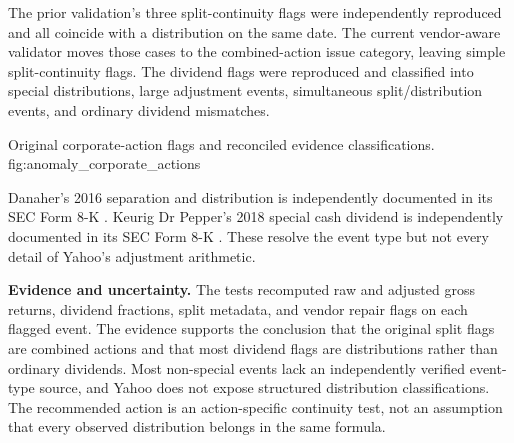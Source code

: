 The prior validation's three split-continuity flags were independently
reproduced and all coincide with a distribution on the same date. The current
vendor-aware validator moves those cases to the combined-action issue category,
leaving \SplitFlags{} simple split-continuity flags. The dividend flags were
reproduced and classified into special distributions, large adjustment events,
simultaneous split/distribution events, and ordinary dividend mismatches.


  {Original corporate-action flags and reconciled evidence classifications.}
  {fig:anomaly_corporate_actions}

Danaher's 2016 separation and distribution is independently documented in its
SEC Form 8-K \citep{secDHR2016}. Keurig Dr Pepper's 2018 special cash dividend
is independently documented in its SEC Form 8-K \citep{secKDP2018}. These
resolve the event type but not every detail of Yahoo's adjustment arithmetic.

\textbf{Evidence and uncertainty.} The tests recomputed raw and adjusted gross
returns, dividend fractions, split metadata, and vendor repair flags on each
flagged event. The evidence supports the conclusion that the original split flags are
combined actions and that most dividend flags are distributions rather than
ordinary dividends. Most non-special events lack an independently verified
event-type source, and Yahoo does not expose structured distribution
classifications. The recommended action is an action-specific continuity test,
not an assumption that every observed distribution belongs in the same formula.

